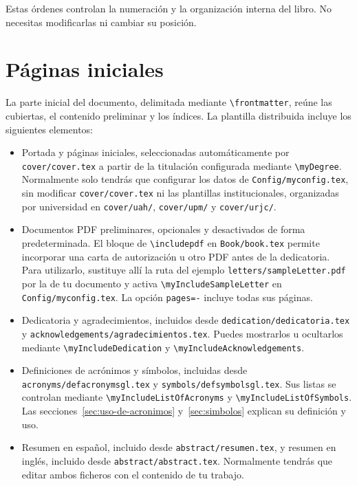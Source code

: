 Estas órdenes controlan la numeración y la organización interna del libro. No necesitas modificarlas ni cambiar su posición.

\section{Páginas iniciales}
\label{sec:paginas-iniciales}

La parte inicial del documento, delimitada mediante \texttt{\textbackslash{}frontmatter}, reúne las cubiertas, el contenido preliminar y los índices. La plantilla distribuida incluye los siguientes elementos:

\begin{itemize}
  \item Portada y páginas iniciales, seleccionadas automáticamente por \texttt{cover/cover.tex} a partir de la titulación configurada mediante \texttt{\textbackslash{}myDegree}. Normalmente solo tendrás que configurar los datos de \texttt{Config/myconfig.tex}, sin modificar \texttt{cover/cover.tex} ni las plantillas institucionales, organizadas por universidad en \texttt{cover/uah/}, \texttt{cover/upm/} y \texttt{cover/urjc/}.
  \item Documentos PDF preliminares, opcionales y desactivados de forma predeterminada. El bloque de \texttt{\textbackslash{}includepdf} en \texttt{Book/book.tex} permite incorporar una carta de autorización u otro PDF antes de la dedicatoria. Para utilizarlo, sustituye allí la ruta del ejemplo \texttt{letters/sampleLetter.pdf} por la de tu documento y activa \texttt{\textbackslash{}myIncludeSampleLetter} en \texttt{Config/myconfig.tex}. La opción \texttt{pages=-} incluye todas sus páginas.
  \item Dedicatoria y agradecimientos, incluidos desde \texttt{dedication/dedicatoria.tex} y \texttt{acknowledgements/agradecimientos.tex}. Puedes mostrarlos u ocultarlos mediante \texttt{\textbackslash{}myIncludeDedication} y \texttt{\textbackslash{}myIncludeAcknowledgements}.
  \item Definiciones de acrónimos y símbolos, incluidas desde \texttt{acronyms/defacronymsgl.tex} y \texttt{symbols/defsymbolsgl.tex}. Sus listas se controlan mediante \texttt{\textbackslash{}myIncludeListOfAcronyms} y \texttt{\textbackslash{}myIncludeListOfSymbols}. Las secciones~\ref{sec:uso-de-acronimos} y~\ref{sec:simbolos} explican su definición y uso.
  \item Resumen en español, incluido desde \texttt{abstract/resumen.tex}, y resumen en inglés, incluido desde \texttt{abstract/abstract.tex}. Normalmente tendrás que editar ambos ficheros con el contenido de tu trabajo.

\end{itemize}

